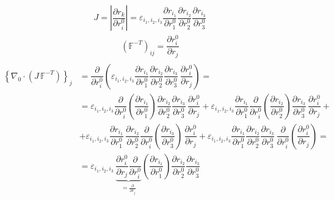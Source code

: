 \documentclass[letterpaper,10pt,english]{jupyterBook}
\begin{document}
\begin{equation*}
\begin{split}J = \left| \dfrac{\partial r_k}{\partial r^0_i} \right| = \varepsilon_{i_1, i_2, i_3} \dfrac{\partial r_{i_1}}{\partial r^0_1} \dfrac{\partial r_{i_2}}{\partial r^0_2} \dfrac{\partial r_{i_3}}{\partial r^0_3}\end{split}
\end{equation*}\begin{equation*}
\begin{split}\left( \mathbb{F}^{-T} \right)_{ij} = \dfrac{\partial r^0_i}{\partial r_j}\end{split}
\end{equation*}\begin{equation*}
\begin{split}\begin{aligned}
\left\{ \nabla_0 \cdot \left( J \, \mathbb{F}^{-T} \right) \right\}_j
 & = \dfrac{\partial }{\partial r_i^0} \left(  \varepsilon_{i_1, i_2, i_3} \dfrac{\partial r_{i_1}}{\partial r^0_1} \dfrac{\partial r_{i_2}}{\partial r^0_2} \dfrac{\partial r_{i_3}}{\partial r^0_3} \,  \dfrac{\partial r^0_i}{\partial r_j}\right) = \\
 & = \varepsilon_{i_1, i_2, i_3} \dfrac{\partial }{\partial r_i^0} \left(\dfrac{\partial r_{i_1}}{\partial r^0_1} \right)\dfrac{\partial r_{i_2}}{\partial r^0_2} \dfrac{\partial r_{i_3}}{\partial r^0_3} \,  \dfrac{\partial r^0_i}{\partial r_j} 
   + \varepsilon_{i_1, i_2, i_3} \dfrac{\partial r_{i_1}}{\partial r^0_1}  \dfrac{\partial }{\partial r_i^0} \left( \dfrac{\partial r_{i_2}}{\partial r^0_2} \right) \dfrac{\partial r_{i_3}}{\partial r^0_3} \,  \dfrac{\partial r^0_i}{\partial r_j} + \\
 & + \varepsilon_{i_1, i_2, i_3} \dfrac{\partial r_{i_1}}{\partial r^0_1} \, \dfrac{\partial r_{i_2}}{\partial r^0_2} \dfrac{\partial }{\partial r_i^0} \left(\dfrac{\partial r_{i_3}}{\partial r^0_3}\right) \,  \dfrac{\partial r^0_i}{\partial r_j} 
   + \varepsilon_{i_1, i_2, i_3}\dfrac{\partial r_{i_1}}{\partial r^0_1} \dfrac{\partial r_{i_2}}{\partial r^0_2} \dfrac{\partial r_{i_3}}{\partial r^0_3} \, \dfrac{\partial }{\partial r_i^0} \left(  \dfrac{\partial r^0_i}{\partial r_j} \right) = \\
 & = \varepsilon_{i_1, i_2, i_3}  \, \underbrace{\dfrac{\partial r^0_i}{\partial r_j}\dfrac{\partial }{\partial r_i^0}}_{= \frac{\partial }{\partial r_j}} \left(\dfrac{\partial r_{i_1}}{\partial r^0_1} \right)\dfrac{\partial r_{i_2}}{\partial r^0_2} \dfrac{\partial r_{i_3}}{\partial r^0_3} 

\end{aligned}
\end{split}
\end{equation*}
\end{document}
